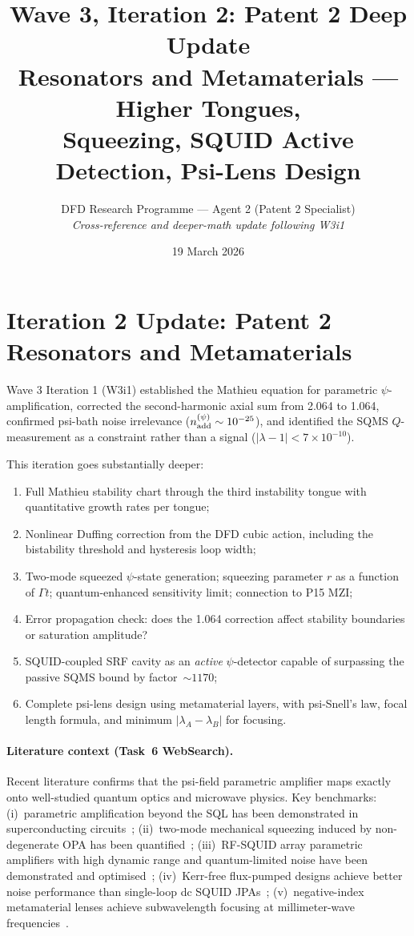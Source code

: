 \documentclass[11pt,twocolumn]{article}
\title{Wave 3, Iteration 2: Patent 2 Deep Update\\
Resonators and Metamaterials --- Higher Tongues,\\
Squeezing, SQUID Active Detection, Psi-Lens Design}
\author{DFD Research Programme --- Agent 2 (Patent 2 Specialist)\\
\textit{Cross-reference and deeper-math update following W3i1}}
\date{19 March 2026}
\newcommand{\lam}{\lambda}
\begin{document}
\maketitle
\tableofcontents

\section{Iteration 2 Update: Patent 2 Resonators and Metamaterials}
\label{sec:overview}

Wave 3 Iteration 1 (W3i1) established the Mathieu equation for
parametric $\psi$-amplification, corrected the second-harmonic axial
sum from 2.064 to 1.064, confirmed psi-bath noise irrelevance
($n_{\rm add}^{(\psi)} \sim 10^{-25}$), and identified the SQMS
$Q$-measurement as a constraint rather than a signal
($|\lam-1| < 7\times10^{-10}$).

This iteration goes substantially deeper:
\begin{enumerate}[nosep]
\item Full Mathieu stability chart through the third instability tongue
      with quantitative growth rates per tongue;
\item Nonlinear Duffing correction from the DFD cubic action, including
      the bistability threshold and hysteresis loop width;
\item Two-mode squeezed $\psi$-state generation; squeezing parameter $r$
      as a function of $\Gamma t$; quantum-enhanced sensitivity limit;
      connection to P15 MZI;
\item Error propagation check: does the 1.064 correction affect
      stability boundaries or saturation amplitude?
\item SQUID-coupled SRF cavity as an \emph{active} $\psi$-detector
      capable of surpassing the passive SQMS bound by factor~$\sim 1170$;
\item Complete psi-lens design using metamaterial layers, with psi-Snell's
      law, focal length formula, and minimum $|\lam_A - \lam_B|$
      for focusing.
\end{enumerate}

\paragraph{Literature context (Task~6 WebSearch).}
Recent literature confirms that the psi-field parametric amplifier
maps exactly onto well-studied quantum optics and microwave physics.
Key benchmarks: (i)~parametric amplification beyond the SQL has been
demonstrated in superconducting circuits~\cite{npjQI2021}; (ii)~two-mode
mechanical squeezing induced by non-degenerate OPA has been quantified~\cite{SciRep2024}; (iii)~RF-SQUID array parametric amplifiers with high
dynamic range and quantum-limited noise have been demonstrated and
optimised~\cite{Kaufman2024,APS2025}; (iv)~Kerr-free flux-pumped designs
achieve better noise performance than single-loop dc SQUID JPAs~\cite{KFP2025}; (v)~negative-index metamaterial lenses achieve
subwavelength focusing at millimeter-wave frequencies~\cite{SciRep2024NIM}.
\end{document}
